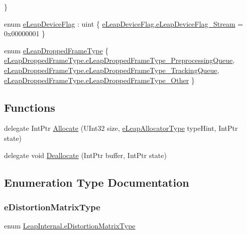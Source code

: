 \begin{DoxyCompactItemize}
 \}
\item 
enum \mbox{\hyperlink{namespace_leap_internal_ac070f7da620782f2faeb48f6b5774672}{e\+Leap\+Device\+Flag}} \+: uint \{ \mbox{\hyperlink{namespace_leap_internal_ac070f7da620782f2faeb48f6b5774672a449e714ffc5a6a58fb1026e98b7ec8c0}{e\+Leap\+Device\+Flag.\+e\+Leap\+Device\+Flag\+\_\+\+Stream}} = 0x00000001
 \}
\item 
enum \mbox{\hyperlink{namespace_leap_internal_af32f98bc0f7257d572aa3f3c3dac43a3}{e\+Leap\+Dropped\+Frame\+Type}} \{ \mbox{\hyperlink{namespace_leap_internal_af32f98bc0f7257d572aa3f3c3dac43a3a5ffadaa01595661c9c3a66535353e7b8}{e\+Leap\+Dropped\+Frame\+Type.\+e\+Leap\+Dropped\+Frame\+Type\+\_\+\+Preprocessing\+Queue}}, 
\mbox{\hyperlink{namespace_leap_internal_af32f98bc0f7257d572aa3f3c3dac43a3a0f6be5a700f887711aed68a14182ef21}{e\+Leap\+Dropped\+Frame\+Type.\+e\+Leap\+Dropped\+Frame\+Type\+\_\+\+Tracking\+Queue}}, 
\mbox{\hyperlink{namespace_leap_internal_af32f98bc0f7257d572aa3f3c3dac43a3a96004d21f3bef15b01e647f518e8a066}{e\+Leap\+Dropped\+Frame\+Type.\+e\+Leap\+Dropped\+Frame\+Type\+\_\+\+Other}}
 \}
\end{DoxyCompactItemize}
\subsection*{Functions}
\begin{DoxyCompactItemize}
\item 
delegate Int\+Ptr \mbox{\hyperlink{namespace_leap_internal_abdbcd89d8bb63e029a380256e3679660}{Allocate}} (U\+Int32 size, \mbox{\hyperlink{namespace_leap_internal_a0c50b13c3367bbb0a225d62335fb6aab}{e\+Leap\+Allocator\+Type}} type\+Hint, Int\+Ptr state)
\item 
delegate void \mbox{\hyperlink{namespace_leap_internal_a5a737b35c25482e1d39e14a9d766553a}{Deallocate}} (Int\+Ptr buffer, Int\+Ptr state)
\end{DoxyCompactItemize}


\subsection{Enumeration Type Documentation}
\mbox{\label{namespace_leap_internal_a1d2bfda35c62f188e88e18ac41c51e98}} 
\subsubsection{\texorpdfstring{eDistortionMatrixType}{eDistortionMatrixType}}
{\footnotesize\ttfamily enum \mbox{\hyperlink{namespace_leap_internal_a1d2bfda35c62f188e88e18ac41c51e98}{Leap\+Internal.\+e\+Distortion\+Matrix\+Type}}\hspace{0.3cm}{\ttfamily [strong]}}

